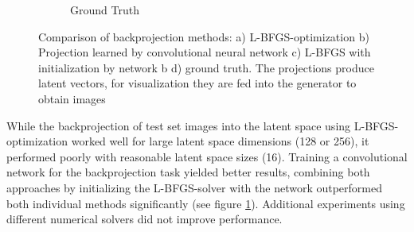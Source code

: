 \documentclass[10pt,twocolumn,letterpaper]{article}
\begin{document}
\begin{figure}[]
\begin{subfigure}[b]{0.11\textwidth}
		\caption{Ground Truth}
	\end{subfigure}
	\caption{Comparison of backprojection methods: a) L-BFGS-optimization b) Projection learned by convolutional neural network c) L-BFGS with initialization by network b d) ground truth. The projections produce latent vectors, for visualization they are fed into the generator to obtain images}
	\label{fig:backprojection}
\end{figure}

While the backprojection of test set images into the latent space using L-BFGS-optimization worked well for large latent space dimensions (128 or 256), it performed poorly with reasonable latent space sizes (16). Training a convolutional network for the backprojection task yielded better results, combining both approaches by initializing the L-BFGS-solver with the network outperformed both individual methods significantly (see figure \ref{fig:backprojection}). Additional experiments using different numerical solvers did not improve performance.
\end{document}
